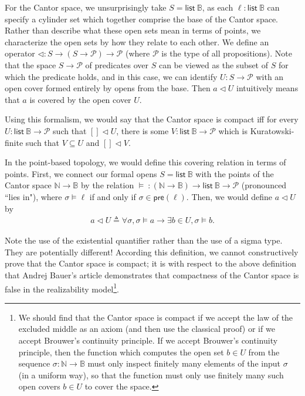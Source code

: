\documentclass{article}           %
\newcommand{\Prop}{\mathcal{P}}
\newcommand{\nat}{\mathbb{N}}
\newcommand{\bool}{\mathbb{B}}
\newcommand{\List}[1]{\mathsf{list}\ {#1}}
\newcommand{\cov}{\triangleleft}
\begin{document}
For the Cantor space, we unsurprisingly take $S = \List{\bool}$, as each $\ell : \List{\bool}$ can specify a cylinder set which together comprise the base of the Cantor space. Rather than describe what these open sets mean in terms of points, we characterize the open sets by how they relate to each other. We define an operator $\cov : S \to (S \to \Prop) \to \Prop$ (where $\Prop$ is the type of all propositions). Note that the space $S \to \Prop$ of predicates over $S$ can be viewed as the subset of $S$ for which the predicate holds, and in this case, we can identify $U : S \to \Prop$ with an open cover formed entirely by opens from the base. Then $a \cov U$ intuitively means that $a$ is covered by the open cover $U$.

Using this formalism, we would say that the Cantor space is compact iff for every $U : \List{\bool} \to \Prop$ such that $[] \cov U$, there is some $V : \List{\bool} \to \Prop$ which is Kuratowski-finite such that $V \subseteq U$ and $[] \cov V$.

In the point-based topology, we would define this covering relation in terms of points. First, we connect our formal opens $S = \List{\bool}$ with the points of the Cantor space $\nat \to \bool$ by the relation $\models\  : (\nat \to \bool) \to \List{\bool} \to \Prop$ (pronounced ``lies in"), where $\sigma \models \ell$ if and only if $\sigma \in \mathsf{pre}(\ell)$. Then, we would define $a \cov U$ by
\begin{align}
\label{ptcov1}
a \cov U \triangleq \forall \sigma, \sigma \models a \to \exists b \in U, \sigma \models b.
\end{align}

Note the use of the existential quantifier rather than the use of a sigma type. They are potentially different! According this definition, we cannot constructively prove that the Cantor space is compact; it is with respect to the above definition that Andrej Bauer's article demonstrates that compactness of the Cantor space is false in the realizability model\footnote{We should find that the Cantor space is compact if we accept the law of the excluded middle as an axiom (and then use the classical proof) or if we accept Brouwer's continuity principle. If we accept Brouwer's continuity principle, then the function which computes the open set $b \in U$ from the sequence $\sigma : \nat \to \bool$ must only inspect finitely many elements of the input $\sigma$ (in a uniform way), so that the function must only use finitely many such open covers $b \in U$ to cover the space.}.
\end{document}
